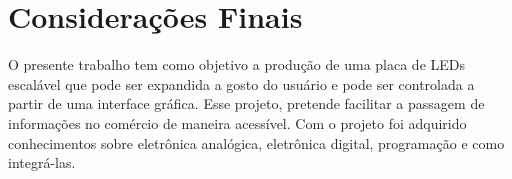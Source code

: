 \chapter{Considerações Finais}

O presente trabalho tem como objetivo a produção de uma placa de LEDs escalável que pode ser expandida a gosto do usuário e pode ser controlada a partir de uma interface gráfica. Esse projeto, pretende facilitar a passagem de informações no comércio de maneira acessível. Com o projeto foi adquirido conhecimentos sobre eletrônica analógica,
eletrônica digital, programação e como integrá-las.
